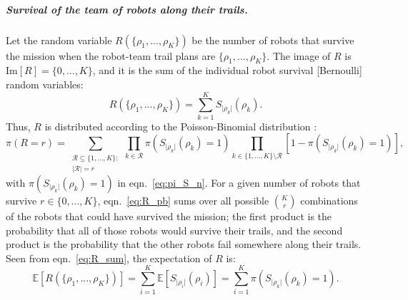 \documentclass[11pt, oneside]{article}
\begin{document}
\subparagraph{Survival of the team of robots along their trails.}
Let the random variable $R(\{\rho_1, ..., \rho_K\})$ be the number of robots that survive the mission when the robot-team trail plans are $\{\rho_1, ..., \rho_K\}$. The image of $R$ is $\text{Im}[R] = \{0, ..., K\}$, and it is the sum of the individual robot survival [Bernoulli] random variables:
\begin{equation}
	R(\{\rho_1, ..., \rho_K\})=\sum_{k=1}^K S_{\lvert \rho_k \rvert}(\rho_k). \label{eq:R_sum}
\end{equation}
Thus, $R$ is distributed according to the Poisson-Binomial distribution \cite{tang2023poisson}:
\begin{equation}
	\pi(R=r) = \sum_{\substack{\mathcal{R} \subseteq \{1, ..., K\} :  \\ \lvert \mathcal{R} \rvert = r} } 
	\prod_{k \in \mathcal{R}} \pi(S_{\lvert \rho_k \rvert}(\rho_k) = 1)
	\prod_{k \in \{1, ..., K\} \setminus \mathcal{R}} [1- \pi(S_{\lvert \rho_k \rvert}(\rho_k) = 1)], %
	\label{eq:R_pb}
\end{equation} with $ \pi(S_{\lvert \rho_k \rvert}(\rho_k) = 1)$ in eqn.~\ref{eq:pi_S_n}.
For a given number of robots that survive $r \in \{0, ..., K\}$, eqn.~\ref{eq:R_pb} sums over all possible $\binom{K}{r}$ combinations of the robots that could have survived the mission; the first product is the probability that all of those robots would survive their trails, and the second product is the probability that the other robots fail somewhere along their trails.
Seen from eqn.~\ref{eq:R_sum}, the expectation of $R$ is:
\begin{equation}
	\mathbb{E}[R(\{\rho_1, ..., \rho_K\})]=\sum_{i=1}^K \mathbb{E}[S_{\lvert \rho_i \rvert}(\rho_i)] = \sum_{i=1}^K  \pi(S_{\lvert \rho_k \rvert}(\rho_k) = 1).
\end{equation}
\end{document}
